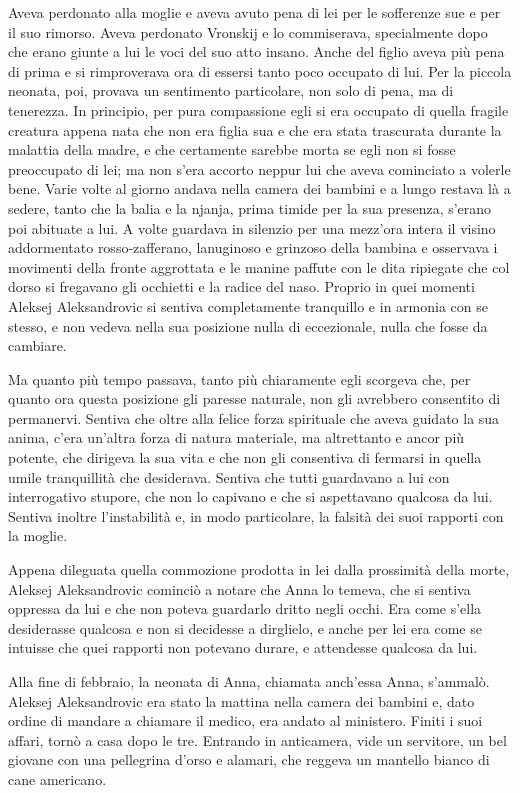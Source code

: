 Aveva perdonato alla moglie e aveva avuto pena di lei per le sofferenze sue e per il suo rimorso. Aveva perdonato Vronskij e lo commiserava, specialmente dopo che erano giunte a lui le voci del suo atto insano. Anche del figlio aveva più pena di prima e si rimproverava ora di essersi tanto poco occupato di lui. Per la piccola neonata, poi, provava un sentimento particolare, non solo di pena, ma di tenerezza. In principio, per pura compassione egli si era occupato di quella fragile creatura appena nata che non era figlia sua e che era stata trascurata durante la malattia della madre, e che certamente sarebbe morta se egli non si fosse preoccupato di lei; ma non s'era accorto neppur lui che aveva cominciato a volerle bene. Varie volte al giorno andava nella camera dei bambini e a lungo restava là a sedere, tanto che la balia e la njanja, prima timide per la sua presenza, s'erano poi abituate a lui. A volte guardava in silenzio per una mezz'ora intera il visino addormentato rosso-zafferano, lanuginoso e grinzoso della bambina e osservava i movimenti della fronte aggrottata e le manine paffute con le dita ripiegate che col dorso si fregavano gli occhietti e la radice del naso. Proprio in quei momenti Aleksej Aleksandrovic si sentiva completamente tranquillo e in armonia con se stesso, e non vedeva nella sua posizione nulla di eccezionale, nulla che fosse da cambiare. 

Ma quanto più tempo passava, tanto più chiaramente egli scorgeva che, per quanto ora questa posizione gli paresse naturale, non gli avrebbero consentito di permanervi. Sentiva che oltre alla felice forza spirituale che aveva guidato la sua anima, c'era un'altra forza di natura materiale, ma altrettanto e ancor più potente, che dirigeva la sua vita e che non gli consentiva di fermarsi in quella umile tranquillità che desiderava. Sentiva che tutti guardavano a lui con interrogativo stupore, che non lo capivano e che si aspettavano qualcosa da lui. Sentiva inoltre l'instabilità e, in modo particolare, la falsità dei suoi rapporti con la moglie. 

Appena dileguata quella commozione prodotta in lei dalla prossimità della morte, Aleksej Aleksandrovic cominciò a notare che Anna lo temeva, che si sentiva oppressa da lui e che non poteva guardarlo dritto negli occhi. Era come s'ella desiderasse qualcosa e non si decidesse a dirglielo, e anche per lei era come se intuisse che quei rapporti non potevano durare, e attendesse qualcosa da lui. 

Alla fine di febbraio, la neonata di Anna, chiamata anch'essa Anna, s'ammalò. Aleksej Aleksandrovic era stato la mattina nella camera dei bambini e, dato ordine di mandare a chiamare il medico, era andato al ministero. Finiti i suoi affari, tornò a casa dopo le tre. Entrando in anticamera, vide un servitore, un bel giovane con una pellegrina d'orso e alamari, che reggeva un mantello bianco di cane americano. 

